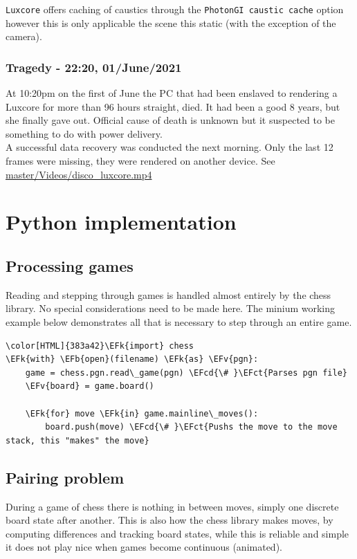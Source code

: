 \documentclass[11pt]{article}
\newcommand{\EFk}[1]{\textcolor{EFk}{#1}} %
\newcommand{\EFb}[1]{\textcolor{EFb}{#1}} %
\newcommand{\EFct}[1]{\textcolor{EFct}{#1}} %
\newcommand{\EFv}[1]{\textcolor{EFv}{#1}} %
\newcommand{\EFcd}[1]{\textcolor{EFcd}{#1}} %
\begin{document}
\texttt{Luxcore} offers caching of caustics through the \texttt{PhotonGI caustic cache} option
however this is only applicable the scene this static (with the exception of the
camera).
\subsubsection{Tragedy - 22:20, 01/June/2021}
\label{sec:orgbf41d6c}
At 10:20pm on the first of June the PC that had been enslaved to rendering a
Luxcore for more than 96 hours straight, died. It had been a good 8 years, but
she finally gave out. Official cause of death is unknown but it suspected to be
something to do with power delivery.\\

A successful data recovery was conducted the next morning. Only the last 12
frames were missing, they were rendered on another device. See
\href{https://github.com/Jake-Moss/blender-chess/blob/master/Videos/disco\_luxcore.mp4}{master/Videos/disco\_luxcore.mp4 }
\section{Python implementation}
\label{sec:orgd4992a2}
\subsection{Processing games}
\label{sec:org0c1b414}
Reading and stepping through games is handled almost entirely by the chess
library. No special considerations need to be made here. The minium working
example below demonstrates all that is necessary to step through an entire game.

\begin{Code}
\begin{Verbatim}[]
\color[HTML]{383a42}\EFk{import} chess
\EFk{with} \EFb{open}(filename) \EFk{as} \EFv{pgn}:
    game = chess.pgn.read\_game(pgn) \EFcd{\# }\EFct{Parses pgn file}
    \EFv{board} = game.board()

    \EFk{for} move \EFk{in} game.mainline\_moves():
        board.push(move) \EFcd{\# }\EFct{Pushs the move to the move stack, this "makes" the move}
\end{Verbatim}
\end{Code}
\subsection{Pairing problem}
\label{sec:org86f6496}
During a game of chess there is nothing in between moves, simply one discrete
board state after another. This is also how the chess library makes moves, by
computing differences and tracking board states, while this is reliable and
simple it does not play nice when games become continuous (animated).
\end{document}
